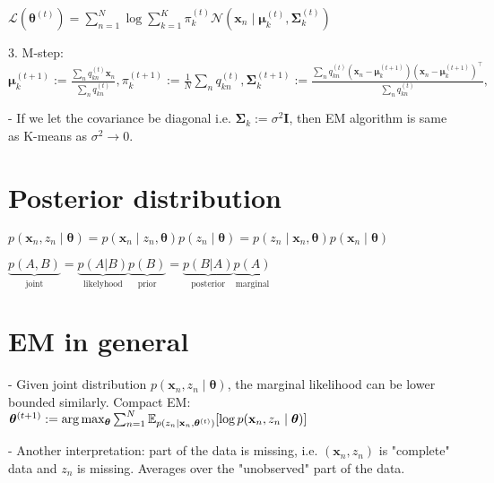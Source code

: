 $
\mathcal{L}\left(\boldsymbol{\theta}^{(t)}\right)=\sum_{n=1}^{N} \log \sum_{k=1}^{K} \pi_{k}^{(t)} \mathcal{N}\left(\mathbf{x}_{n} \mid \boldsymbol{\mu}_{k}^{(t)}, \boldsymbol{\Sigma}_{k}^{(t)}\right)
$

3. M-step:
$
\boldsymbol{\mu}_{k}^{(t+1)}:=\frac{\sum_{n} q_{k n}^{(t)} \mathbf{x}_{n}}{\sum_{n} q_{k n}^{(t)}},
\pi_{k}^{(t+1)}:=\frac{1}{N} \sum_{n} q_{k n}^{(t)},
\boldsymbol{\Sigma}_{k}^{(t+1)}:=\frac{\sum_{n} q_{k n}^{(t)}\left(\mathbf{x}_{n}-\boldsymbol{\mu}_{k}^{(t+1)}\right)\left(\mathbf{x}_{n}-\boldsymbol{\mu}_{k}^{(t+1)}\right)^{\top}}{\sum_{n} q_{k n}^{(t)}},
$

- If we let the covariance be diagonal i.e. $\boldsymbol{\Sigma}_{k}:=\sigma^{2} \mathbf{I}$, then EM algorithm is same as K-means as $\sigma^{2} \rightarrow 0$.

\section*{Posterior distribution}

$p\left(\mathbf{x}_{n}, z_{n} \mid \boldsymbol{\theta}\right)=p\left(\mathbf{x}_{n} \mid z_{n}, \boldsymbol{\theta}\right) p\left(z_{n} \mid \boldsymbol{\theta}\right)=p\left(z_{n} \mid \mathbf{x}_{n}, \boldsymbol{\theta}\right) p\left(\mathbf{x}_{n} \mid \boldsymbol{\theta}\right)$

$\underbrace{p(A,B)}_{\text{joint}}=\underbrace{p(A|B)}_{\text{likelyhood}}\underbrace{p(B)}_{\text{prior}}=\underbrace{p(B|A)}_{\text{posterior}}\underbrace{p(A)}_{\text{marginal}}$

\section*{EM in general}
- Given joint distribution $p\left(\mathbf{x}_{n}, z_{n} \mid \boldsymbol{\theta}\right)$, the marginal likelihood can be lower bounded similarly. Compact EM:
$\boldsymbol{\theta}^{(t+1)} \\:= \arg \max_{\boldsymbol{\theta}} \sum_{n=1}^{N} \mathbb{E}_{p(z_{n} \mid \mathbf{x}_{n}, \boldsymbol{\theta}^{(t)})}[\log p(\mathbf{x}_{n}, z_{n} \mid \boldsymbol{\theta})]$

- Another interpretation: part of the data is missing, i.e. $\left(\mathbf{x}_{n}, z_{n}\right)$ is "complete" data and $z_{n}$ is missing. Averages over the "unobserved" part of the data.